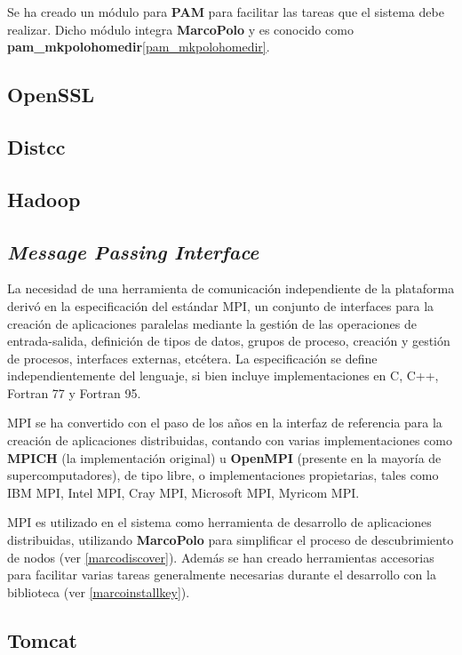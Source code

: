 Se ha creado un módulo para \textbf{PAM} para facilitar las tareas que el sistema debe realizar. Dicho módulo integra \textbf{MarcoPolo} y es conocido como \textbf{pam\_mkpolohomedir}\ref{pam_mkpolohomedir}. 

\subsection{OpenSSL}

\subsection{Distcc}

\subsection{Hadoop}

\subsection{\textit{Message Passing Interface}}

La necesidad de una herramienta de comunicación independiente de la plataforma derivó en la especificación del estándar MPI\cite{MPISpec}, un conjunto de interfaces para la creación de aplicaciones paralelas mediante la gestión de las operaciones de entrada-salida, definición de tipos de datos, grupos de proceso, creación y gestión de procesos, interfaces externas, etcétera. La especificación se define independientemente del lenguaje, si bien incluye implementaciones en C, C++, Fortran 77 y Fortran 95.

MPI se ha convertido con el paso de los años en la interfaz de referencia para la creación de aplicaciones distribuidas, contando con varias implementaciones como \textbf{MPICH} (la implementación original) u \textbf{OpenMPI} (presente en la mayoría de supercomputadores), de tipo libre, o implementaciones propietarias, tales como IBM MPI, Intel MPI, Cray MPI, Microsoft MPI, Myricom MPI.

MPI es utilizado en el sistema como herramienta de desarrollo de aplicaciones distribuidas, utilizando \textbf{MarcoPolo} para simplificar el proceso de descubrimiento de nodos (ver \ref{marcodiscover}). Además se han creado herramientas accesorias para facilitar varias tareas generalmente necesarias durante el desarrollo con la biblioteca (ver \ref{marcoinstallkey}).

\subsection{Tomcat}

